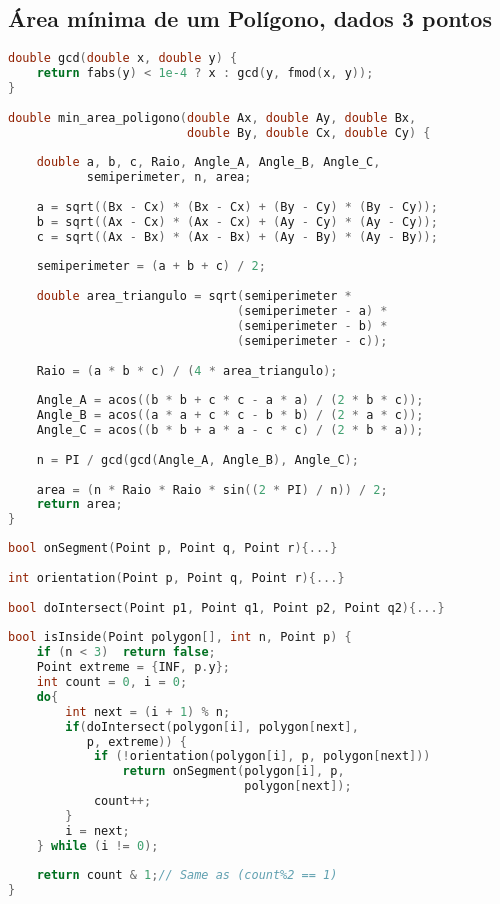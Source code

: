 \newpage

\subsection*{Área mínima de um Polígono, dados 3 pontos}
\begin{lstlisting}[language=C++]
double gcd(double x, double y) {
    return fabs(y) < 1e-4 ? x : gcd(y, fmod(x, y));
}
 
double min_area_poligono(double Ax, double Ay, double Bx, 
                         double By, double Cx, double Cy) {
                         
    double a, b, c, Raio, Angle_A, Angle_B, Angle_C, 
           semiperimeter, n, area;
    
    a = sqrt((Bx - Cx) * (Bx - Cx) + (By - Cy) * (By - Cy));
    b = sqrt((Ax - Cx) * (Ax - Cx) + (Ay - Cy) * (Ay - Cy));
    c = sqrt((Ax - Bx) * (Ax - Bx) + (Ay - By) * (Ay - By));
    
    semiperimeter = (a + b + c) / 2;
 
    double area_triangulo = sqrt(semiperimeter * 
    							(semiperimeter - a) * 
                                (semiperimeter - b) * 
                                (semiperimeter - c));
 
    Raio = (a * b * c) / (4 * area_triangulo);
 
    Angle_A = acos((b * b + c * c - a * a) / (2 * b * c));
    Angle_B = acos((a * a + c * c - b * b) / (2 * a * c));
    Angle_C = acos((b * b + a * a - c * c) / (2 * b * a));
 
    n = PI / gcd(gcd(Angle_A, Angle_B), Angle_C);
    
    area = (n * Raio * Raio * sin((2 * PI) / n)) / 2;
    return area;
}
\end{lstlisting}
\newpage
\begin{lstlisting}[language=C++, title={Checa se um ponto está dentro do polígono}]
bool onSegment(Point p, Point q, Point r){...}
 
int orientation(Point p, Point q, Point r){...}
 
bool doIntersect(Point p1, Point q1, Point p2, Point q2){...}
 
bool isInside(Point polygon[], int n, Point p) {
    if (n < 3)  return false;
    Point extreme = {INF, p.y};
    int count = 0, i = 0;
    do{
    	int next = (i + 1) % n;
        if(doIntersect(polygon[i], polygon[next], 
           p, extreme)) {
        	if (!orientation(polygon[i], p, polygon[next]))
            	return onSegment(polygon[i], p, 
                				 polygon[next]);
            count++;
        }
        i = next;
    } while (i != 0);
 
    return count & 1;// Same as (count%2 == 1)
}
\end{lstlisting}

